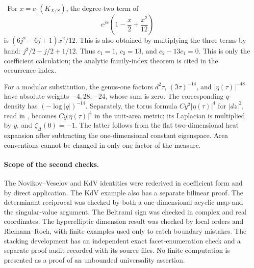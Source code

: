 \begin{example}\oursComputed\
For \(x=c_1(K_{X/S})\), the degree-two term of
\[
 e^{jx}\left(1-\frac{x}{2}+\frac{x^2}{12}\right)
\]
is \((6j^2-6j+1)x^2/12\). This is also obtained by multiplying the three
terms by hand: \(j^2/2-j/2+1/12\). Thus \(c_1=1\), \(c_2=13\), and
\(c_2-13c_1=0\). This is only the coefficient calculation; the analytic
family-index theorem is cited in the occurrence index.

For a modular substitution, the genus-one factors
\(d^2\tau\), \((\Im\tau)^{-14}\), and \(|\eta(\tau)|^{-48}\) have
absolute weights \(-4,28,-24\), whose sum is zero. The corresponding
\(q\)-density has \((-\log|q|)^{-14}\). Separately, the torus formula
\(C y^2|\eta(\tau)|^4\) for \(|dz|^2\), read in
\citet[\S5.0.1, equation (5.1)]{kokotov2007polyhedral}, becomes
\(C y|\eta(\tau)|^4\) in the unit-area metric: its Laplacian is multiplied
by \(y\), and \(\zeta_\Delta(0)=-1\). The latter follows from the flat
two-dimensional heat expansion after subtracting the one-dimensional
constant eigenspace. Area conventions cannot be changed in only one factor
of the measure.
\end{example}

\paragraph{Scope of the second checks.}
The Novikov--Veselov and KdV identities were rederived in coefficient form and
by direct application. The KdV example also has a separate bilinear proof.
The determinant reciprocal was checked by both a one-dimensional acyclic map
and the singular-value argument. The Beltrami sign was checked in complex and
real coordinates. The hyperelliptic dimension result was checked by local
orders and Riemann--Roch, with finite examples used only to catch boundary
mistakes. The stacking development has an independent exact facet-enumeration
check and a separate proof audit recorded with its source files. No finite
computation is presented as a proof of an unbounded universality assertion.
